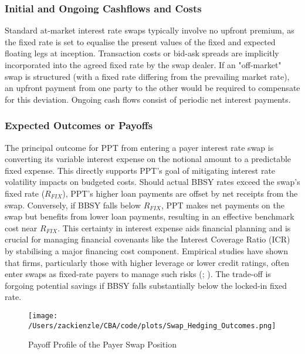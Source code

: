 \documentclass[11pt, a4paper, british]{article}
\begin{document}
\subsubsection{Initial and Ongoing Cashflows and Costs}
Standard at-market interest rate swaps typically involve no upfront premium, as the fixed rate is set to equalise the present values of the fixed and expected floating legs at inception. Transaction costs or bid-ask spreads are implicitly incorporated into the agreed fixed rate by the swap dealer. If an "off-market" swap is structured (with a fixed rate differing from the prevailing market rate), an upfront payment from one party to the other would be required to compensate for this deviation. Ongoing cash flows consist of periodic net interest payments.

\subsubsection{Expected Outcomes or Payoffs}
The principal outcome for PPT from entering a payer interest rate swap is converting its variable interest expense on the notional amount to a predictable fixed expense. This directly supports PPT's goal of mitigating interest rate volatility impacts on budgeted costs. Should actual BBSY rates exceed the swap's fixed rate ($R_{FIX}$), PPT's higher loan payments are offset by net receipts from the swap. Conversely, if BBSY falls below $R_{FIX}$, PPT makes net payments on the swap but benefits from lower loan payments, resulting in an effective benchmark cost near $R_{FIX}$. This certainty in interest expense aids financial planning and is crucial for managing financial covenants like the Interest Coverage Ratio (ICR) by stabilising a major financing cost component. Empirical studies have shown that firms, particularly those with higher leverage or lower credit ratings, often enter swaps as fixed-rate payers to manage such risks (\cite{ml}; \cite{ts}). The trade-off is forgoing potential savings if BBSY falls substantially below the locked-in fixed rate.

\begin{figure}[H]
 \centering
 \texttt{[image: /Users/zackienzle/CBA/code/plots/Swap\_Hedging\_Outcomes.png]} 
 \caption{Payoff Profile of the Payer Swap Position}
    \label{fig:swap_hedging_outcomes}
\end{figure}
\end{document}
